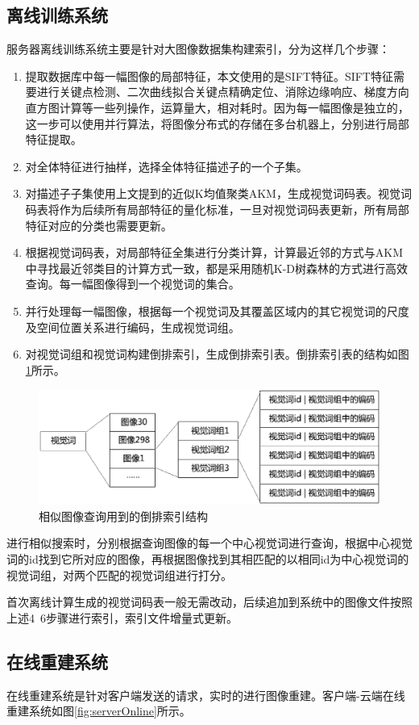 \subsection{离线训练系统}
服务器离线训练系统主要是针对大图像数据集构建索引，分为这样几个步骤：
\begin{enumerate}
\item 提取数据库中每一幅图像的局部特征，本文使用的是SIFT特征。SIFT特征需要进行关键点检测、二次曲线拟合关键点精确定位、消除边缘响应、梯度方向直方图计算等一些列操作，运算量大，相对耗时。因为每一幅图像是独立的，这一步可以使用并行算法，将图像分布式的存储在多台机器上，分别进行局部特征提取。
\item 对全体特征进行抽样，选择全体特征描述子的一个子集。
\item 对描述子子集使用上文提到的近似K均值聚类AKM，生成视觉词码表。视觉词码表将作为后续所有局部特征的量化标准，一旦对视觉词码表更新，所有局部特征对应的分类也需要更新。
\item 根据视觉词码表，对局部特征全集进行分类计算，计算最近邻的方式与AKM中寻找最近邻类目的计算方式一致，都是采用随机K-D树森林的方式进行高效查询。每一幅图像得到一个视觉词的集合。
\item 并行处理每一幅图像，根据每一个视觉词及其覆盖区域内的其它视觉词的尺度及空间位置关系进行编码，生成视觉词组。
\item 对视觉词组和视觉词构建倒排索引，生成倒排索引表。倒排索引表的结构如图\ref{fig:inverted}所示。
\end{enumerate}
\begin{figure}
\centering\includegraphics[width=13cm]{imgs/ch4/inverted}
\caption{相似图像查询用到的倒排索引结构}
\label{fig:inverted}
\end{figure}
进行相似搜索时，分别根据查询图像的每一个中心视觉词进行查询，根据中心视觉词的id找到它所对应的图像，再根据图像找到其相匹配的以相同id为中心视觉词的视觉词组，对两个匹配的视觉词组进行打分。

首次离线计算生成的视觉词码表一般无需改动，后续追加到系统中的图像文件按照上述4~6步骤进行索引，索引文件增量式更新。

\subsection{在线重建系统}
在线重建系统是针对客户端发送的请求，实时的进行图像重建。客户端-云端在线重建系统如图\ref{fig:serverOnline}所示。

